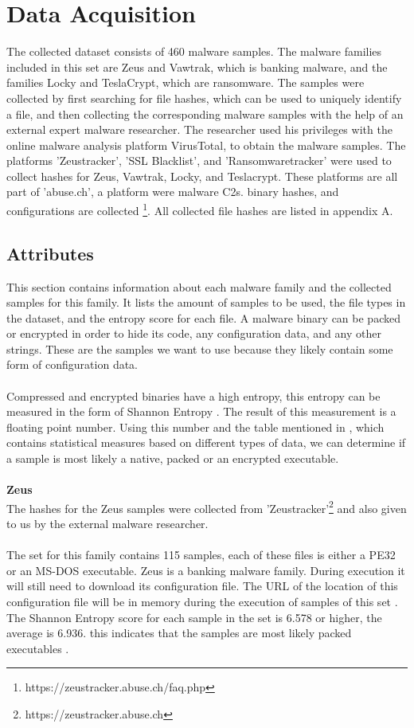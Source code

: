 \documentclass[conference]{IEEEtran}
\begin{document}
\section{Data Acquisition}

The collected dataset consists of 460 malware samples. The malware families included in this set are Zeus and Vawtrak, which is banking malware, and the families Locky and TeslaCrypt, which are ransomware.  The samples were collected  by first searching for file hashes, which can be used to uniquely identify a file,  and then collecting the corresponding malware samples with the help of an external expert malware researcher. The researcher used his privileges with the online malware analysis platform VirusTotal, to obtain the malware samples. The platforms 'Zeustracker', 'SSL Blacklist', and 'Ransomwaretracker' were used to collect hashes for Zeus, Vawtrak, Locky, and Teslacrypt. These platforms are all part of 'abuse.ch', a platform were malware C2s. binary hashes, and configurations are collected \footnote{https://zeustracker.abuse.ch/faq.php}. All collected file hashes are listed in appendix A.

\subsection{Attributes}	
This section contains information about each malware family and the collected samples for this family. It lists the amount of samples to be used, the file types in the dataset, and the entropy score for each file. A malware binary can be packed or encrypted in order to hide its code, any configuration data, and any other strings. These are the samples we want to use because they likely contain some form of configuration data. \\\\Compressed and encrypted binaries have a high entropy, this entropy can be measured in the form of Shannon Entropy \cite{hamrock-entropy}. The result of this measurement is a floating point number. Using this number and the table mentioned in \cite{hamrock-entropy}, which contains statistical measures based on different types of data, we can determine if a sample is most likely a native, packed or an encrypted executable.
\\\\

\textbf{Zeus}\\
The hashes for the Zeus samples were collected from 'Zeustracker'\footnote{https://zeustracker.abuse.ch} and also given to us by the external malware researcher. \\\\The set for this family contains 115 samples, each of these files is either a PE32 or an MS-DOS executable. Zeus is a banking malware family. During execution it will still need to download its configuration file. The URL of the location of this configuration file will be in memory during the execution of samples of this set \cite{wyke-zeus}. The Shannon Entropy score for each sample in the set is 6.578 or higher, the average is 6.936. this indicates that the samples are most likely packed executables \cite{hamrock-entropy}.\\
\end{document}
